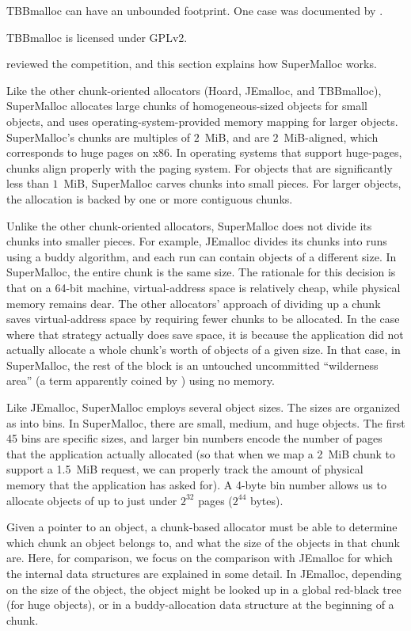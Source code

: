 \documentclass[pldi]{sigplanconf-pldi15}
\begin{document}
TBBmalloc can have an unbounded footprint.  One case was documented by
\cite{Vyukov08}.

TBBmalloc is licensed under GPLv2.


 reviewed the competition, and this section explains how
SuperMalloc works.   

Like the other chunk-oriented allocators (Hoard, JEmalloc, and
TBBmalloc), SuperMalloc allocates large chunks of homogeneous-sized
objects for small objects, and uses operating-system-provided memory
mapping for larger objects.  SuperMalloc's chunks are multiples of
$2$~MiB, and are $2$~MiB-aligned, which corresponds to huge pages on
x86.  In operating systems that support huge-pages, chunks align
properly with the paging system.  For objects that are significantly
less than $1$~MiB, SuperMalloc carves chunks into small pieces.  For
larger objects, the allocation is backed by one or more contiguous
chunks.

Unlike the other chunk-oriented allocators, SuperMalloc does not
divide its chunks into smaller pieces.  For example, JEmalloc divides
its chunks into runs using a buddy algorithm, and each run can contain
objects of a different size.  In SuperMalloc, the entire chunk is the
same size.  The rationale for this decision is that on a 64-bit
machine, virtual-address space is relatively cheap, while physical
memory remains dear.  The other allocators' approach of dividing up a
chunk saves virtual-address space by requiring fewer chunks to be
allocated.  In the case where that strategy actually does save space,
it is because the application did not actually allocate a whole
chunk's worth of objects of a given size.  In that case, in
SuperMalloc, the rest of the block is an untouched uncommitted
``wilderness area'' (a term apparently coined by \cite{KornVo85})
using no memory.

Like JEmalloc, SuperMalloc employs several object sizes.  The sizes
are organized as into bins.  In SuperMalloc, there are small, medium,
and huge objects.  The first 45 bins are specific sizes, and larger
bin numbers encode the number of pages that the application actually
allocated (so that when we map a 2~MiB chunk to support a 1.5~MiB
request, we can properly track the amount of physical memory that the
application has asked for).  A 4-byte bin number allows us to allocate
objects of up to just under $2^{32}$ pages ($2^{44}$ bytes).

Given a pointer to an object, a chunk-based allocator must be able to
determine which chunk an object belongs to, and what the size of the
objects in that chunk are.  Here, for comparison, we focus on the
comparison with JEmalloc for which the internal data structures are
explained in some detail.  In JEmalloc, depending on the size of the
object, the object might be looked up in a global red-black tree (for
huge objects), or in a buddy-allocation data structure at the
beginning of a chunk.  
\end{document}
